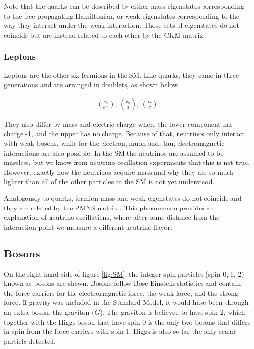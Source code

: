 Note that the quarks can be described by either mass eigenstates corresponding to the free-propagating Hamiltonian, or weak eigenstates corresponding to the way they interact under the weak interaction. Those sets of eigenstates do not coincide but are instead related to each other by the CKM matrix \cite{thomson}. 




\subsubsection{Leptons}
Leptons are the other six fermions in the SM. Like quarks, they come in three generations and are arranged in doublets, as shown below.

\begin{align}
    \binom{\nu_e}{e^-} \text{,  } \binom{\nu_\mu}{\mu} \text{,  } \binom{\nu_\tau}{\tau}
\end{align}

They also differ by mass and electric charge where the lower component has charge -1, and the upper has no charge. Because of that, neutrinos only interact with weak bosons, while for the electron, muon and, tau, electromagnetic interactions are also possible. In the SM the neutrinos are assumed to be massless, but we know from neutrino oscillation experiments that this is not true. However, exactly how the neutrinos acquire mass and why they are so much lighter than all of the other particles in the SM is not yet understood. 

Analogously to quarks, fermion mass and weak eigenstates do not coincide and they are related by the PMNS matrix \cite{thomson}. This phenomenon provides an explanation of neutrino oscillations, where after some distance from the interaction point we measure a different neutrino flavor. 


\subsection{Bosons}
On the right-hand side of figure \ref{fig:SM}, the integer spin particles (spin-0, 1, 2) known as bosons \cite{thomson} are shown. Bosons follow Bose-Einstein statistics and contain the force carriers for the electromagnetic force, the weak force, and the strong force. If gravity was included in the Standard Model, it would have been through an extra boson, the graviton ($G$). The graviton is believed to have spin-2, which together with the Higgs boson that have spin-0 is the only two bosons that differs in spin from the force carriers with spin-1. Higgs is also so far the only scalar particle detected.

